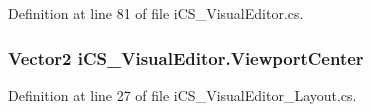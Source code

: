 Definition at line 81 of file i\+C\+S\+\_\+\+Visual\+Editor.\+cs.

\hypertarget{classi_c_s___visual_editor_a1285b746b55847563b8ff784be9b85c4}{
\subsubsection[{Viewport\+Center}]{\setlength{\rightskip}{0pt plus 5cm}Vector2 i\+C\+S\+\_\+\+Visual\+Editor.\+Viewport\+Center\hspace{0.3cm}{\ttfamily [get]}}}\label{classi_c_s___visual_editor_a1285b746b55847563b8ff784be9b85c4}


Definition at line 27 of file i\+C\+S\+\_\+\+Visual\+Editor\+\_\+\+Layout.\+cs.



